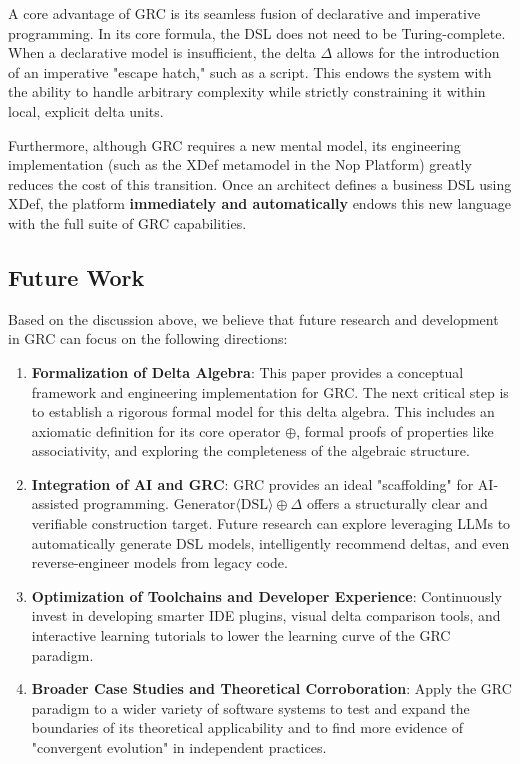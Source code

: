\documentclass[11pt]{article}
\begin{document}
A core advantage of GRC is its seamless fusion of declarative and imperative programming. In its core formula, the DSL does not need to be Turing-complete. When a declarative model is insufficient, the delta $\Delta$ allows for the introduction of an imperative "escape hatch," such as a script. This endows the system with the ability to handle arbitrary complexity while strictly constraining it within local, explicit delta units.

Furthermore, although GRC requires a new mental model, its engineering implementation (such as the XDef metamodel in the Nop Platform) greatly reduces the cost of this transition. Once an architect defines a business DSL using XDef, the platform \textbf{immediately and automatically} endows this new language with the full suite of GRC capabilities.

\subsection{Future Work}

Based on the discussion above, we believe that future research and development in GRC can focus on the following directions:

\begin{enumerate}
    \item \textbf{Formalization of Delta Algebra}: This paper provides a conceptual framework and engineering implementation for GRC. The next critical step is to establish a rigorous formal model for this delta algebra. This includes an axiomatic definition for its core operator $\oplus$, formal proofs of properties like associativity, and exploring the completeness of the algebraic structure.
    \item \textbf{Integration of AI and GRC}: GRC provides an ideal "scaffolding" for AI-assisted programming. $\text{Generator}\langle\text{DSL}\rangle \oplus \Delta$ offers a structurally clear and verifiable construction target. Future research can explore leveraging LLMs to automatically generate DSL models, intelligently recommend deltas, and even reverse-engineer models from legacy code.
    \item \textbf{Optimization of Toolchains and Developer Experience}: Continuously invest in developing smarter IDE plugins, visual delta comparison tools, and interactive learning tutorials to lower the learning curve of the GRC paradigm.
    \item \textbf{Broader Case Studies and Theoretical Corroboration}: Apply the GRC paradigm to a wider variety of software systems to test and expand the boundaries of its theoretical applicability and to find more evidence of "convergent evolution" in independent practices.
\end{enumerate}
\end{document}
